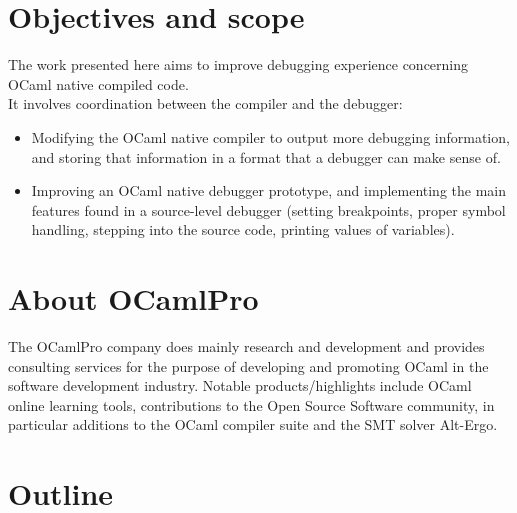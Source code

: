 \newpage

\section{Objectives and scope\label{sec:objective}}

The work presented here aims to improve debugging experience concerning OCaml
native compiled code. \\
It involves coordination between the compiler and the debugger:

\begin{itemize}
    \item Modifying the OCaml native compiler to output more debugging
        information,
        and storing that information in a format that a debugger can make
        sense of.
    \item  Improving an OCaml native debugger prototype, and implementing the main features found in a source-level
        debugger (setting breakpoints, proper symbol handling, stepping into the source
        code, printing values of variables).
\end{itemize}

\section{About OCamlPro}

The OCamlPro\autocite{ocp} company does mainly research and development and provides
consulting services for the purpose of developing and promoting OCaml in the
software development industry.
Notable products/highlights include OCaml online learning tools, contributions
to the Open Source Software community, in particular additions to the OCaml
compiler suite and the SMT solver Alt-Ergo.





\section{Outline\label{sec:outline}}

